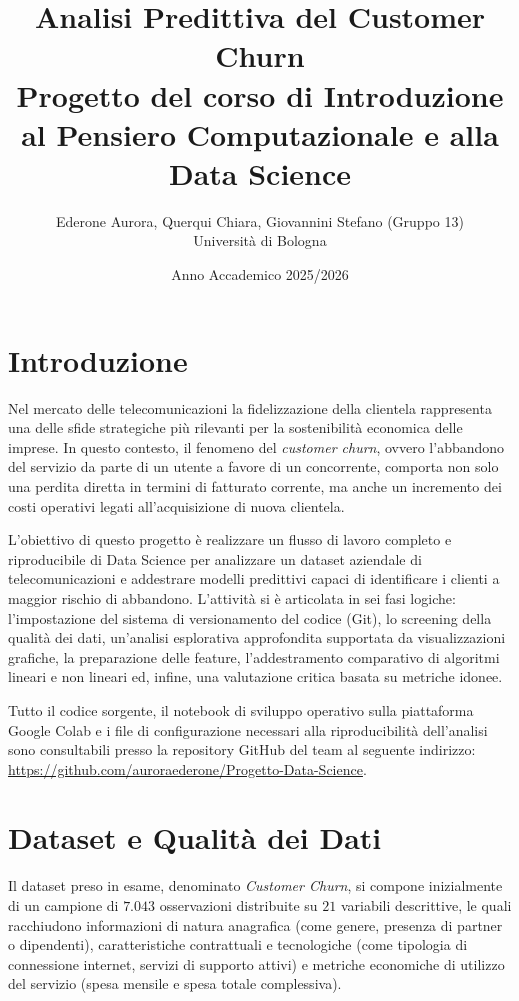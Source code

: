 \documentclass[11pt,a4paper]{article}
\title{\textbf{Analisi Predittiva del Customer Churn}\\
\large Progetto del corso di Introduzione al Pensiero Computazionale e alla Data Science}
\author{Ederone Aurora, Querqui Chiara, Giovannini Stefano \small (Gruppo 13) \\ Università di Bologna}
\date{Anno Accademico 2025/2026}
\begin{document}
\maketitle

\section{Introduzione}
Nel mercato delle telecomunicazioni la fidelizzazione della clientela rappresenta una delle sfide strategiche più rilevanti per la sostenibilità economica delle imprese. In questo contesto, il fenomeno del \textit{customer churn}, ovvero l'abbandono del servizio da parte di un utente a favore di un concorrente, comporta non solo una perdita diretta in termini di fatturato corrente, ma anche un incremento dei costi operativi legati all'acquisizione di nuova clientela.

L'obiettivo di questo progetto è realizzare un flusso di lavoro completo e riproducibile di Data Science per analizzare un dataset aziendale di telecomunicazioni e addestrare modelli predittivi capaci di identificare i clienti a maggior rischio di abbandono. L'attività si è articolata in sei fasi logiche: l'impostazione del sistema di versionamento del codice (Git), lo screening della qualità dei dati, un'analisi esplorativa approfondita supportata da visualizzazioni grafiche, la preparazione delle feature, l'addestramento comparativo di algoritmi lineari e non lineari ed, infine, una valutazione critica basata su metriche idonee.

Tutto il codice sorgente, il notebook di sviluppo operativo sulla piattaforma Google Colab e i file di configurazione necessari alla riproducibilità dell'analisi sono consultabili presso la repository GitHub del team al seguente indirizzo: 
\url{https://github.com/auroraederone/Progetto-Data-Science}.


\section{Dataset e Qualità dei Dati}
Il dataset preso in esame, denominato \textit{Customer Churn}, si compone inizialmente di un campione di $7.043$ osservazioni distribuite su $21$ variabili descrittive, le quali racchiudono informazioni di natura anagrafica (come genere, presenza di partner o dipendenti), caratteristiche contrattuali e tecnologiche (come tipologia di connessione internet, servizi di supporto attivi) e metriche economiche di utilizzo del servizio (spesa mensile e spesa totale complessiva). 
\end{document}
